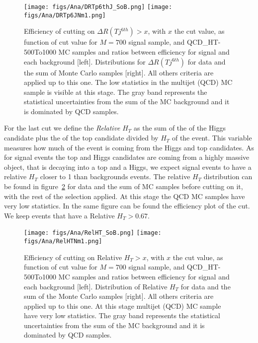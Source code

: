 \begin{figure}[!Hhtbp]
  \begin{center}
    \texttt{[image: figs/Ana/DRTp6thJ\_SoB.png]}
    \texttt{[image: figs/Ana/DRTp6JNm1.png]}
    \caption{Efficiency of cutting on $\Delta R (T j^{6th})>x$, with $x$ the cut value, as function of cut value for $M=700$ \GeVcc signal sample, \ttbar and QCD\_HT-500To1000 MC samples and ratios between efficiency for signal and each background [left]. Distributions for $\Delta R (T j^{6th})$  for data and the sum of Monte Carlo samples [right]. All others criteria are applied up to this one. The low statistics in the multijet (QCD) MC sample is visible at this stage. The gray band represents the statistical uncertainties from the sum of the MC background and it is dominated by QCD samples.}
    \label{fig:jet6}
  \end{center}
\end{figure}

For the last cut we define the \textit{Relative} $H_{T}$ as the sum of the \pt of the Higgs candidate plus the \pt of the top candidate divided by $H_{T}$ of the event. This variable measures how much \pt of the event is coming from the Higgs and top candidates. As for signal events the top and Higgs candidates are coming from a highly massive object, that is decaying into a top and a Higgs, we expect signal events to have a relative $H_{T}$ closer to 1 than backgrounds events. The relative $H_{T}$ distribution can be found in figure~\ref{fig:RelHtMass} for data and the sum of MC samples before cutting on it, with the rest of the selection applied. At this stage the QCD MC samples have very low statistics. In the same figure can be found the efficiency plot of the cut. We keep events that have a Relative $H_{T}>0.67$. 

\begin{figure}[!Hhtbp]
  \begin{center}
    \texttt{[image: figs/Ana/RelHT\_SoB.png]}
    \texttt{[image: figs/Ana/RelHTNm1.png]}
    \caption{Efficiency of cutting on Relative $H_{T}>x$, with $x$ the cut value, as function of cut value for $M=700$ \GeVcc signal sample, \ttbar and QCD\_HT-500To1000 MC samples and ratios between efficiency for signal and each background [left]. Distribution of Relative $H_{T}$ for data and the sum of the Monte Carlo samples [right]. All others criteria are applied up to this one. At this stage multijet (QCD) MC sample have very low statistics. The gray band represents the statistical uncertainties from the sum of the MC background and it is dominated by QCD samples.}
    \label{fig:RelHtMass}
  \end{center}
\end{figure}


